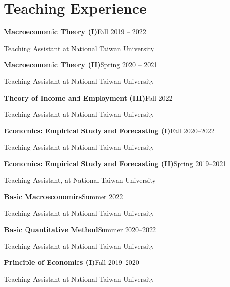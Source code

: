 \documentclass{article}
\newcommand{\cvsection}[1]{\section*{\rmfamily#1}}
\begin{document}
\cvsection{Teaching Experience}
\indent





\textbf{Macroeconomic Theory (I)}\hfill Fall 2019 -- 2022

\hspace{2em}Teaching Assistant at National Taiwan University

\textbf{Macroeconomic Theory (II)}\hfill Spring 2020 -- 2021

\hspace{2em}Teaching Assistant at National Taiwan University

\textbf{Theory of Income and Employment (III)}\hfill Fall 2022

\hspace{2em}Teaching Assistant at National Taiwan University

\textbf{Economics: Empirical Study and Forecasting (I)}\hfill Fall 2020--2022

\hspace{2em}Teaching Assistant at National Taiwan University

\textbf{Economics: Empirical Study and Forecasting (II)}\hfill Spring 2019--2021

\hspace{2em}Teaching Assistant, at National Taiwan University

\textbf{Basic Macroeconomics}\hfill Summer 2022

\hspace{2em}Teaching Assistant at National Taiwan University

\textbf{Basic Quantitative Method}\hfill Summer 2020--2022

\hspace{2em}Teaching Assistant at National Taiwan University

\textbf{Principle of Economics (I)}\hfill Fall 2019--2020

\hspace{2em}Teaching Assistant at National Taiwan University
\end{document}
